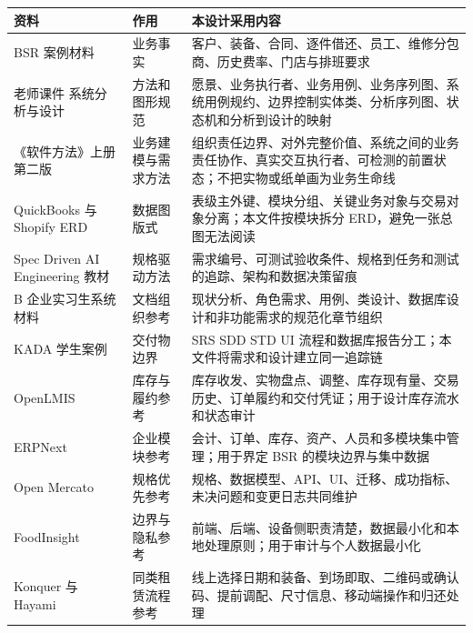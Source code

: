 {\def\LTcaptype{none} %
\begin{longtable}[]{@{}
  >{\centering\arraybackslash}p{}
  >{\raggedright\arraybackslash}p{}
  >{\raggedright\arraybackslash}p{}@{}}
\toprule\noalign{}\rowcolor{TableHead}
\begin{minipage}[b]{\linewidth}\color{white}\bfseries\centering
\textbf{资料}
\end{minipage} & \begin{minipage}[b]{\linewidth}\color{white}\bfseries\centering
\textbf{作用}
\end{minipage} & \begin{minipage}[b]{\linewidth}\color{white}\bfseries\centering
\textbf{本设计采用内容}
\end{minipage} \\
\midrule\noalign{}
\endhead
\bottomrule\noalign{}
\endlastfoot
BSR 案例材料 & 业务事实 & 客户、装备、合同、逐件借还、员工、维修分包商、历史费率、门店与排班要求 \\
老师课件 系统分析与设计 & 方法和图形规范 & 愿景、业务执行者、业务用例、业务序列图、系统用例规约、边界控制实体类、分析序列图、状态机和分析到设计的映射 \\
《软件方法》上册第二版 & 业务建模与需求方法 & 组织责任边界、对外完整价值、系统之间的业务责任协作、真实交互执行者、可检测的前置状态；不把实物或纸单画为业务生命线 \\
QuickBooks 与 Shopify ERD & 数据图版式 & 表级主外键、模块分组、关键业务对象与交易对象分离；本文件按模块拆分 ERD，避免一张总图无法阅读 \\
Spec Driven AI Engineering 教材 & 规格驱动方法 & 需求编号、可测试验收条件、规格到任务和测试的追踪、架构和数据决策留痕 \\
B 企业实习生系统材料 & 文档组织参考 & 现状分析、角色需求、用例、类设计、数据库设计和非功能需求的规范化章节组织 \\
KADA 学生案例 & 交付物边界 & SRS SDD STD UI 流程和数据库报告分工；本文件将需求和设计建立同一追踪链 \\
OpenLMIS & 库存与履约参考 & 库存收发、实物盘点、调整、库存现有量、交易历史、订单履约和交付凭证；用于设计库存流水和状态审计 \\
ERPNext & 企业模块参考 & 会计、订单、库存、资产、人员和多模块集中管理；用于界定 BSR 的模块边界与集中数据 \\
Open Mercato & 规格优先参考 & 规格、数据模型、API、UI、迁移、成功指标、未决问题和变更日志共同维护 \\
FoodInsight & 边界与隐私参考 & 前端、后端、设备侧职责清楚，数据最小化和本地处理原则；用于审计与个人数据最小化 \\
Konquer 与 Hayami & 同类租赁流程参考 & 线上选择日期和装备、到场即取、二维码或确认码、提前调配、尺寸信息、移动端操作和归还处理 \\
\end{longtable}
}

